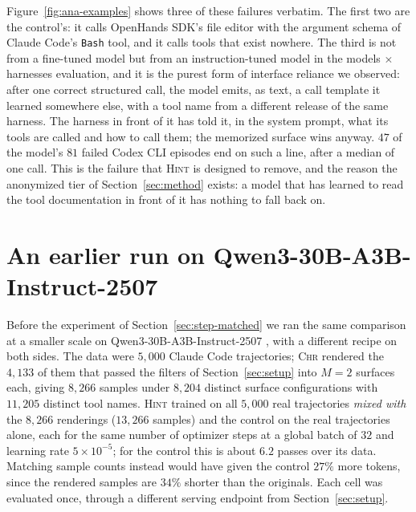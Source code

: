 \documentclass{article} %
\newcommand{\method}{\textsc{Hint}}
\newcommand{\chr}{\textsc{Chr}}
\newcommand{\oldmodel}{Qwen3-30B-A3B-Instruct-2507}   %
\newcommand{\claudecode}{Claude Code}
\newcommand{\codexcli}{Codex CLI}
\newcommand{\openhands}{OpenHands SDK}   %
\begin{document}
Figure~\ref{fig:ana-examples} shows three of these failures verbatim. The
first two are the control's: it calls \openhands{}'s file editor with the
argument schema of \claudecode{}'s \texttt{Bash} tool, and it calls tools that
exist nowhere. The third is not from a fine-tuned model but from an instruction-tuned
model in the models $\times$ harnesses evaluation, and it is the purest form
of interface reliance we observed: after one correct structured call, the
model emits, as text, a call template it learned somewhere else, with a tool
name from a different release of the same harness. The harness in front of it
has told it, in the system prompt, what its tools are called and how to call
them; the memorized surface wins anyway. $47$ of the model's $81$ failed
\codexcli{} episodes end on such a line, after a median of one call. This is
the failure that \method{} is designed to remove, and the reason the
anonymized tier of Section~\ref{sec:method} exists: a model that has learned
to read the tool documentation in front of it has nothing to fall back on.

\section{An earlier run on \oldmodel{}}
\label{app:e1-30b}

Before the experiment of Section~\ref{sec:step-matched} we ran the same comparison at a
smaller scale on \oldmodel{} \citep{qwen3,qwen3_30b_card}, with a different
recipe on both sides. The data were $5{,}000$ \claudecode{} trajectories;
\chr{} rendered the $4{,}133$ of them that passed the filters of Section~\ref{sec:setup} into $M=2$ surfaces each, giving $8{,}266$ samples under
$8{,}204$ distinct surface configurations with $11{,}205$ distinct tool names.
\method{} trained on all $5{,}000$ real trajectories \emph{mixed with} the
$8{,}266$ renderings ($13{,}266$ samples) and the control on the real
trajectories alone, each for the same number of optimizer steps at a global
batch of $32$ and learning rate $5\times10^{-5}$; for the control this is about $6.2$
passes over its data. Matching sample counts instead would have given the
control $27\%$ more tokens, since the rendered samples are $34\%$ shorter than
the originals. Each cell was evaluated once, through a different serving endpoint from
Section~\ref{sec:setup}.
\end{document}
